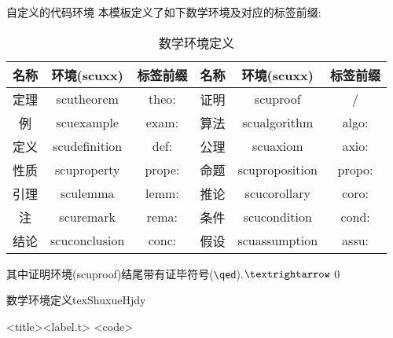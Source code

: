 \documentclass[hyperref,UTF8,11pt,CJK]{beamer}
\begin{document}
\begin{frame}{自定义的代码环境}
	本模板定义了如下数学环境及对应的标签前缀: 
	\begin{table}[htbp!]
		\centering\scriptsize
		\caption{数学环境定义}
		\label{tab:ShuxueHjdy}
		\begin{tabular}{ccc|ccc}
			\toprule
			名称 & 环境(scuxx) & 标签前缀 & 名称 & 环境(scuxx) & 标签前缀 \\
			\midrule
			定理 & \color{JXred}scutheorem & theo: & 证明 & \color{JXred}scuproof & / \\
			例 & \color{JXred}scuexample & exam: & 算法 & \color{JXred}scualgorithm & algo: \\
			定义 & \color{JXred}scudefinition & def: & 公理 & \color{JXred}scuaxiom & axio: \\
			性质 & \color{JXred}scuproperty & prope: & 命题 & \color{JXred}scuproposition & propo: \\
			引理 & \color{JXred}sculemma & lemm: & 推论 & \color{JXred}scucorollary & coro: \\
			注 & \color{JXred}scuremark & rema: & 条件 & \color{JXred}scucondition & cond: \\
			结论 & \color{JXred}scuconclusion & conc: & 假设 & \color{JXred}scuassumption & assu: \\
			\bottomrule
		\end{tabular}
	\end{table}
	其中证明环境(scuproof)结尾带有证毕符号(\verb|\qed|).$\textrightarrow$\qed
	\begin{scushow}[comment={%
			\vskip1ex%
			\scriptsize%
			{\color{JXred}<env>}\quad 环境名称(见\vref{tab:ShuxueHjdy})\\
			{\color{JXred}<keys.t>}\quad 添加到tcolorbox中的参数, 如comment, sidebyside等\\
			{\color{JXred}<title>}\quad 标题\\
			{\color{JXred}<label.t>}\quad 引用标签尾部, 头部已定义(code:), {\color{JXred}scuproof}环境无该选项\\
			{\color{JXred}<code>}\quad 代码\\
		},%
		listing above comment]{数学环境定义}{tex}{}{ShuxueHjdy}
			\begin{<env>}[<keys.t>]{<title>}{<label.t>}
				<code>
			\end{<env>}
	\end{scushow}
\end{frame}
\end{document}
